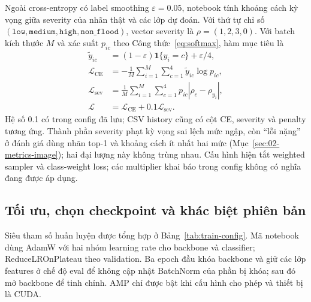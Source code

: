Ngoài cross-entropy có label smoothing $\varepsilon=0.05$, notebook tính khoảng cách kỳ vọng giữa severity của nhãn thật và các lớp dự đoán. Với thứ tự chỉ số $(\texttt{low},\texttt{medium},\texttt{high},\texttt{non\_flood})$, vector severity là $\rho=(1,2,3,0)$. Với batch kích thước $M$ và xác suất $p_{ic}$ theo Công thức~\ref{eq:softmax}, hàm mục tiêu là
\begin{align}
\widetilde y_{ic}&=(1-\varepsilon)\mathbf{1}\{y_i=c\}+\varepsilon/4,\\
\mathcal L_{\mathrm{CE}}&=-\frac{1}{M}\sum_{i=1}^{M}\sum_{c=1}^{4}\widetilde y_{ic}\log p_{ic},\\
\mathcal L_{\mathrm{sev}}&=\frac{1}{M}\sum_{i=1}^{M}\sum_{c=1}^{4}p_{ic}|\rho_c-\rho_{y_i}|,\\
\mathcal L&=\mathcal L_{\mathrm{CE}}+0.1\mathcal L_{\mathrm{sev}}.\label{eq:training-loss}
\end{align}
Hệ số 0.1 có trong config đã lưu; CSV history cũng có cột CE, severity và penalty tương ứng. Thành phần severity phạt kỳ vọng sai lệch mức ngập, còn ``lỗi nặng'' ở đánh giá dùng nhãn top-1 và khoảng cách ít nhất hai mức (Mục~\ref{sec:02-metrics-image}); hai đại lượng này không trùng nhau. Cấu hình hiện tắt weighted sampler và class-weight loss; các multiplier khai báo trong config không có nghĩa đang được áp dụng.

\subsection{Tối ưu, chọn checkpoint và khác biệt phiên bản}
Siêu tham số huấn luyện được tổng hợp ở Bảng~\ref{tab:train-config}. Mã notebook dùng AdamW với hai nhóm learning rate cho backbone và classifier; ReduceLROnPlateau theo validation. Ba epoch đầu khóa backbone và giữ các lớp features ở chế độ eval để không cập nhật BatchNorm của phần bị khóa; sau đó mở backbone để tinh chỉnh. AMP chỉ được bật khi cấu hình cho phép và thiết bị là CUDA.

